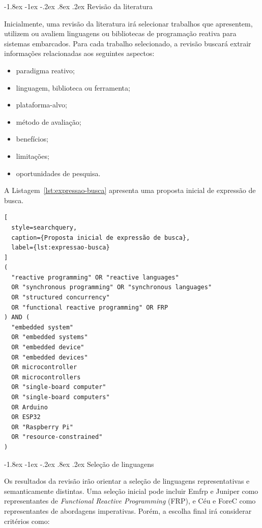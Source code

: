 \documentclass[12pt,a4paper]{article}
\makeatletter
\renewcommand\subsection{\@startsection{subsection}{2}{\z@}%
  {-1.8ex \@plus -1ex \@minus -.2ex}%
  {.8ex \@plus .2ex}%
  {\normalfont\bfseries}}
\makeatother
\begin{document}
\subsection{Revisão da literatura}

Inicialmente, uma revisão da literatura irá selecionar trabalhos que apresentem,
utilizem ou avaliem linguagens ou bibliotecas de programação reativa para sistemas embarcados.
Para cada trabalho selecionado, a revisão buscará extrair informações relacionadas aos seguintes aspectos:

\begin{itemize}[leftmargin=2cm,itemsep=0pt,topsep=3pt]
  \item paradigma reativo;
  \item linguagem, biblioteca ou ferramenta;
  \item plataforma-alvo;
  \item método de avaliação;
  \item benefícios;
  \item limitações;
  \item oportunidades de pesquisa.
\end{itemize}

A Listagem~\ref{lst:expressao-busca} apresenta uma proposta inicial de expressão de busca.

\begin{lstlisting}[
  style=searchquery,
  caption={Proposta inicial de expressão de busca},
  label={lst:expressao-busca}
]
(
  "reactive programming" OR "reactive languages"
  OR "synchronous programming" OR "synchronous languages"
  OR "structured concurrency"
  OR "functional reactive programming" OR FRP
) AND (
  "embedded system"
  OR "embedded systems"
  OR "embedded device"
  OR "embedded devices"
  OR microcontroller
  OR microcontrollers
  OR "single-board computer"
  OR "single-board computers"
  OR Arduino
  OR ESP32
  OR "Raspberry Pi"
  OR "resource-constrained"
)
\end{lstlisting}

\subsection{Seleção de linguagens}

Os resultados da revisão irão orientar a seleção de linguagens representativas e semanticamente distintas.
Uma seleção inicial pode incluir Emfrp e Juniper como representantes de \textit{Functional Reactive Programming} (FRP),
e Céu e ForeC como representantes de abordagens imperativas.
Porém, a escolha final irá considerar critérios como:
\end{document}
